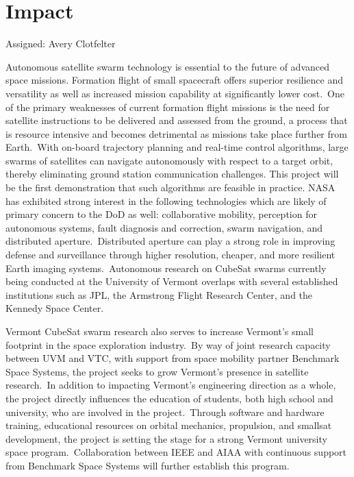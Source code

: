 \section{Impact}
Assigned: Avery Clotfelter

Autonomous satellite swarm technology is essential to the future of
advanced space missions. Formation flight of small spacecraft offers
superior resilience and versatility as well as increased mission
capability at significantly lower cost. One of the primary weaknesses
of current formation flight missions is the need for satellite
instructions to be delivered and assessed from the ground, a process
that is resource intensive and becomes detrimental as missions take
place further from Earth. With on-board trajectory planning and real-time 
control algorithms, large swarms of satellites can navigate autonomously 
with respect to a target orbit, thereby eliminating ground station 
communication challenges. This project will be the first demonstration that 
such algorithms are feasible in practice. NASA has exhibited strong interest in the
following technologies which are likely of primary concern to the DoD
as well: collaborative mobility, perception for autonomous systems,
fault diagnosis and correction, swarm navigation, and distributed
aperture. Distributed aperture can play a strong role in improving
defense and surveillance through higher resolution, cheaper, and more
resilient Earth imaging systems. Autonomous research on CubeSat
swarms currently being conducted at the University of Vermont overlaps
with several established institutions such as JPL, the Armstrong
Flight Research Center, and the Kennedy Space Center. 

Vermont CubeSat swarm research also serves to increase Vermont’s small
footprint in the space exploration industry. By way of joint research
capacity between UVM and VTC, with support from space mobility partner
Benchmark Space Systems, the project seeks to grow Vermont’s presence
in satellite research. In addition to impacting Vermont’s engineering
direction as a whole, the project directly influences the education of
students, both high school and university, who are involved in the
project. Through software and hardware training, educational
resources on orbital mechanics, propulsion, and smallsat development,
the project is setting the stage for a strong Vermont university space
program. Collaboration between IEEE and AIAA with continuous support
from Benchmark Space Systems will further establish this program.

